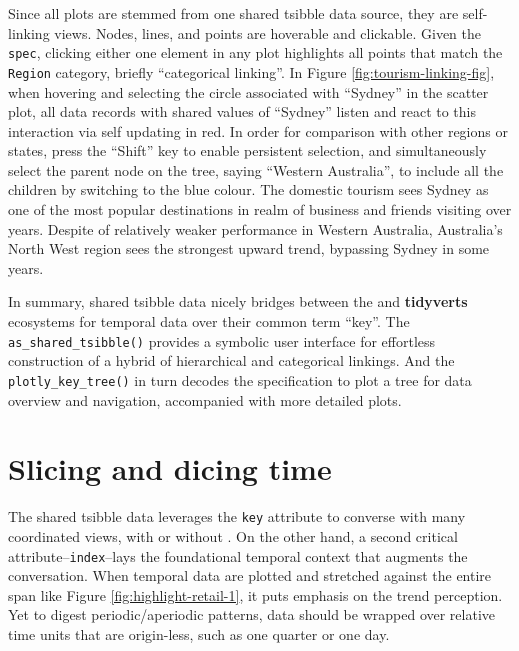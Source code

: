 Since all plots are stemmed from one shared tsibble data source, they
are self-linking views. Nodes, lines, and points are hoverable and
clickable. Given the \texttt{spec}, clicking either one element in any
plot highlights all points that match the \texttt{Region} category,
briefly ``categorical linking''. In Figure
\ref{fig:tourism-linking-fig}, when hovering and selecting the circle
associated with ``Sydney'' in the scatter plot, all data records with
shared values of ``Sydney'' listen and react to this interaction via
self updating in red. In order for comparison with other regions or
states, press the ``Shift'' key to enable persistent selection, and
simultaneously select the parent node on the tree, saying ``Western
Australia'', to include all the children by switching to the blue
colour. The domestic tourism sees Sydney as one of the most popular
destinations in realm of business and friends visiting over years.
Despite of relatively weaker performance in Western Australia,
Australia's North West region sees the strongest upward trend, bypassing
Sydney in some years.

In summary, shared tsibble data nicely bridges between the
 and \textbf{tidyverts} ecosystems for temporal data
over their common term ``key''. The \texttt{as\_shared\_tsibble()}
provides a symbolic user interface for effortless construction of a
hybrid of hierarchical and categorical linkings. And the
\texttt{plotly\_key\_tree()} in turn decodes the specification to plot a
tree for data overview and navigation, accompanied with more detailed
plots.

\hypertarget{slicing-and-dicing-time}{%
\section{Slicing and dicing time}\label{slicing-and-dicing-time}}

The shared tsibble data leverages the \texttt{key} attribute to converse
with many coordinated views, with or without . On the
other hand, a second critical attribute--\texttt{index}--lays the
foundational temporal context that augments the conversation. When
temporal data are plotted and stretched against the entire span like
Figure \ref{fig:highlight-retail-1}, it puts emphasis on the trend
perception. Yet to digest periodic/aperiodic patterns, data should be
wrapped over relative time units that are origin-less, such as one
quarter or one day.

